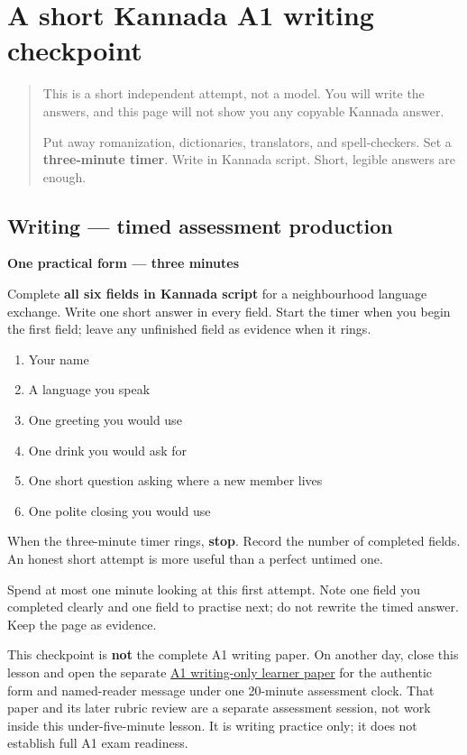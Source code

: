 \section[(short timed A1 writing checkpoint)]{A short Kannada A1 writing checkpoint}

\label{lesson:KA-W77-a1-timed-production}



\begin{quote}
This is a short independent attempt, not a model. You will write the answers, and this page will not show you any copyable Kannada answer.

Put away romanization, dictionaries, translators, and spell-checkers. Set a \textbf{three-minute timer}. Write in Kannada script. Short, legible answers are enough.
\end{quote}

\subsection*{Writing — timed assessment production}
\textbf{One practical form — three minutes}

Complete \textbf{all six fields in Kannada script} for a neighbourhood language exchange. Write one short answer in every field. Start the timer when you begin the first field; leave any unfinished field as evidence when it rings.

\begin{enumerate}
\raggedright
  \item Your name
  \item A language you speak
  \item One greeting you would use
  \item One drink you would ask for
  \item One short question asking where a new member lives
  \item One polite closing you would use
\end{enumerate}

When the three-minute timer rings, \textbf{stop}. Record the number of completed fields. An honest short attempt is more useful than a perfect untimed one.

\begin{tcolorbox}[breakable,colback=teal!4,colframe=teal!35!black,title={Before you move on}]
Spend at most one minute looking at this first attempt. Note one field you completed clearly and one field to practise next; do not rewrite the timed answer. Keep the page as evidence.

This checkpoint is \textbf{not} the complete A1 writing paper. On another day, close this lesson and open the separate \href{https://github.com/adhithyan15/coding-adventures/blob/main/code/learning/human-languages/kannada/mocks/a1/writing-paper-1.md}{A1 writing-only learner paper} for the authentic form and named-reader message under one 20-minute assessment clock. That paper and its later rubric review are a separate assessment session, not work inside this under-five-minute lesson. It is writing practice only; it does not establish full A1 exam readiness.
\end{tcolorbox}
